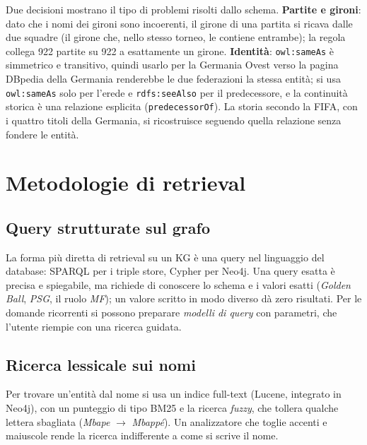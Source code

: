 \documentclass[11pt,a4paper]{article}
\newcommand{\code}[1]{\texttt{\small #1}}
\begin{document}
Due decisioni mostrano il tipo di problemi risolti dallo schema. \textbf{Partite e gironi}: dato che i nomi dei gironi sono incoerenti, il girone di una partita si ricava dalle due squadre (il girone che, nello stesso torneo, le contiene entrambe); la regola collega 922 partite su 922 a esattamente un girone. \textbf{Identità}: \code{owl:sameAs} è simmetrico e transitivo, quindi usarlo per la Germania Ovest verso la pagina DBpedia della Germania renderebbe le due federazioni la stessa entità; si usa \code{owl:sameAs} solo per l'erede e \code{rdfs:seeAlso} per il predecessore, e la continuità storica è una relazione esplicita (\code{predecessorOf}). La storia secondo la FIFA, con i quattro titoli della Germania, si ricostruisce seguendo quella relazione senza fondere le entità.

\section{Metodologie di retrieval}

\subsection{Query strutturate sul grafo}
La forma più diretta di retrieval su un KG è una query nel linguaggio del database: SPARQL per i triple store, Cypher per Neo4j. Una query esatta è precisa e spiegabile, ma richiede di conoscere lo schema e i valori esatti (\emph{Golden Ball}, \emph{PSG}, il ruolo \emph{MF}); un valore scritto in modo diverso dà zero risultati. Per le domande ricorrenti si possono preparare \emph{modelli di query} con parametri, che l'utente riempie con una ricerca guidata.

\subsection{Ricerca lessicale sui nomi}
Per trovare un'entità dal nome si usa un indice full-text (Lucene, integrato in Neo4j), con un punteggio di tipo BM25 e la ricerca \emph{fuzzy}, che tollera qualche lettera sbagliata (\emph{Mbape} $\to$ \emph{Mbappé}). Un analizzatore che toglie accenti e maiuscole rende la ricerca indifferente a come si scrive il nome.
\end{document}
